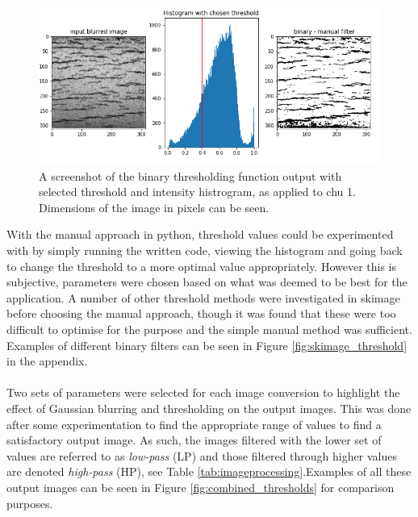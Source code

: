 \documentclass{article}
\begin{document}
	\begin{figure}[h]
	    \centering
	    \includegraphics[scale=0.5]{Figures/chu1_skbinary.png}
	    \caption{A screenshot of the binary thresholding function output with selected threshold and intensity histrogram, as applied to chu 1. Dimensions of the image in pixels can be seen.}
	    \label{skbinary}
	\end{figure}
	
	\noindent With the manual approach in python, threshold values could be experimented with by simply running the written code, viewing the histogram and going back to change the threshold to a more optimal value appropriately. However this is subjective, parameters were chosen based on what was deemed to be best for the application. A number of other threshold methods were investigated in skimage before choosing the manual approach, though it was found that these were too difficult to optimise for the purpose and the simple manual method was sufficient. Examples of different binary filters can be seen in Figure \ref{fig:skimage_threshold} in the appendix.
	\\
	\\
	\noindent Two sets of parameters were selected for each image conversion to highlight the effect of Gaussian blurring and thresholding on the output images. This was done after some experimentation to find the appropriate range of values to find a satisfactory output image. As such, the images filtered with the lower set of values are referred to as \textit{low-pass} (LP) and those filtered through higher values are denoted \textit{high-pass} (HP), see Table \ref{tab:imageprocessing}.Examples of all these output images can be seen in Figure \ref{fig:combined_thresholds} for comparison purposes.
	
\end{document}
